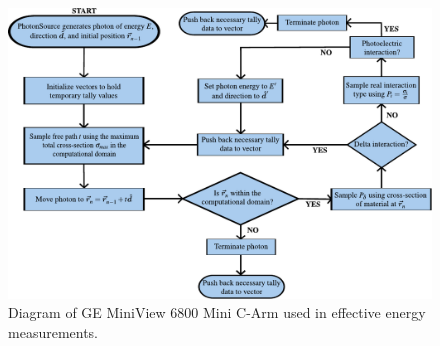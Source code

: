 \begin{figure}[H]
    \centering
	\includegraphics[width=1.0\textwidth]{../figures/physics_engine_flow_chart.pdf}
	\caption{Diagram of GE MiniView 6800 Mini C-Arm used in effective energy measurements.}
	\label{fig:PhysicsEngineFlowChart}
\end{figure}